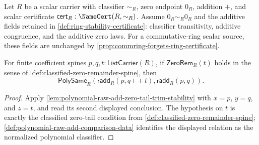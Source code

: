 \begin{proposition}
\label{prop:polynomial-raw-add-right-zero-tail-invariance}
Let $R$ be a scalar carrier with classifier $\sim_R$, zero endpoint $0_R$, addition $+$, and scalar certificate $\mathsf{cert}_R:\NameCert(R,\sim_R)$. Assume $0_R\sim_R0_R$ and the additive fields retained in \autoref{def:ring-stability-certificate}: classifier transitivity, additive congruence, and the additive zero laws. For a commutative-ring scalar source, these fields are unchanged by \autoref{prop:commring-forgets-ring-certificate}.

For finite coefficient spines $p,q,t:\mathsf{ListCarrier}(R)$, if $\mathsf{ZeroRem}_R(t)$ holds in the sense of \autoref{def:classified-zero-remainder-spine}, then
$$
\mathsf{PolySame}_R(\mathsf{radd}_R(p,q{++}t),\mathsf{radd}_R(p,q)).
$$
\end{proposition}
\begin{proof}
Apply \autoref{lem:polynomial-raw-add-zero-tail-trim-stability} with $x=p$, $y=q$, and $z=t$, and read its second displayed conclusion. The hypothesis on $t$ is exactly the classified zero-tail condition from \autoref{def:classified-zero-remainder-spine}; \autoref{def:polynomial-raw-add-comparison-data} identifies the displayed relation as the normalized polynomial classifier.
\end{proof}


